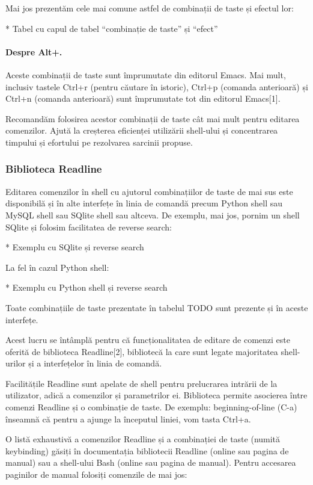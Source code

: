 Mai jos prezentăm cele mai comune astfel de combinații de taste și efectul lor:

* Tabel cu capul de tabel “combinație de taste” și “efect”

\paragraph{Despre Alt+.}

Aceste combinații de taste sunt împrumutate din editorul Emacs. Mai mult,
inclusiv tastele Ctrl+r (pentru căutare în istoric), Ctrl+p (comanda anterioară)
și Ctrl+n (comanda anterioară) sunt împrumutate tot din editorul Emacs[1].

Recomandăm folosirea acestor combinații de taste cât mai mult pentru editarea
comenzilor. Ajută la creșterea eficienței utilizării shell-ului și concentrarea
timpului și efortului pe rezolvarea sarcinii propuse.

\subsubsection{Biblioteca Readline}
\label{sec:cli-readline}

Editarea comenzilor în shell cu ajutorul combinațiilor de taste de mai sus este
disponibilă și în alte interfețe în linia de comandă precum Python shell sau
MySQL shell sau SQlite shell sau altceva. De exemplu, mai jos, pornim un shell
SQlite și folosim facilitatea de reverse search:

* Exemplu cu SQlite și reverse search

La fel în cazul Python shell:

* Exemplu cu Python shell și reverse search

Toate combinațiile de taste prezentate în tabelul TODO sunt prezente și în
aceste interfețe.

Acest lucru se întâmplă pentru că funcționalitatea de editare de comenzi este
oferită de biblioteca Readline[2], bibliotecă la care sunt legate majoritatea
shell-urilor și a interfețelor în linia de comandă.

Facilitățile Readline sunt apelate de shell pentru prelucrarea intrării de la
utilizator, adică a comenzilor și parametrilor ei. Biblioteca permite asocierea
între comenzi Readline și o combinație de taste. De exemplu: beginning-of-line
(C-a) înseamnă că pentru a ajunge la începutul liniei, vom tasta Ctrl+a.

O listă exhaustivă a comenzilor Readline și a combinației de taste (numită
keybinding) găsiți în documentația bibliotecii Readline (online sau pagina de
manual) sau a shell-ului Bash (online sau pagina de manual). Pentru accesarea
paginilor de manual folosiți comenzile de mai jos:

